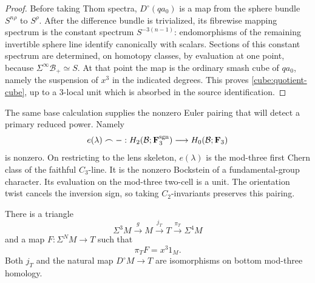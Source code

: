 \begin{proof}
Before taking Thom spectra, \(D^\circ(qa_0)\) is a map
from the sphere bundle \(S^{n\rho}\) to \(S^\rho\).
After the difference bundle is trivialized, its fibrewise
mapping spectrum is the constant spectrum
\(S^{-3(n-1)}\): endomorphisms of the remaining invertible
sphere line identify canonically with scalars.
Sections of this constant spectrum are determined, on
homotopy classes, by evaluation at one point, because
\(\Sigma^\infty\mathcal B_+\simeq S\).
At that point the map is the ordinary smash cube of \(qa_0\),
namely the suspension of \(x^3\) in the indicated degrees.
This proves \eqref{cube:quotient-cube}, up to a 3-local unit
which is absorbed in the source identification.
\end{proof}

The same base calculation supplies the nonzero Euler pairing
that will detect a primary reduced power.  Namely
\begin{equation}\label{cube:euler-pairing}
 e(\lambda)\frown-:
 H_2(\mathcal B;\mathbf F_3^{\mathrm{sgn}})
 \longrightarrow H_0(\mathcal B;\mathbf F_3)
\end{equation}
is nonzero.  On restricting to the lens skeleton, \(e(\lambda)\)
is the mod-three first Chern class of the faithful \(C_3\)-line.
It is the nonzero Bockstein of a fundamental-group character.
Its evaluation on the mod-three two-cell is a unit.  The
orientation twist cancels the inversion sign, so taking
\(C_2\)-invariants preserves this pairing.

\begin{lemma}\label{cube:attachment}
There is a triangle
\begin{equation}\label{cube:T-triangle}
 \Sigma^3M\xrightarrow{g}M\xrightarrow{j_T}T
      \xrightarrow{\pi_T}\Sigma^4M
\end{equation}
and a map \(F:\Sigma^NM\to T\) such that
\[
 \pi_TF=x^3 1_M.
\]
Both \(j_T\) and the natural map \(D^\circ M\to T\) are
isomorphisms on bottom mod-three homology.
\end{lemma}

